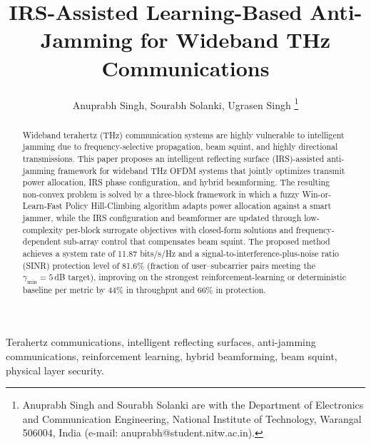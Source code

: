 \documentclass[10pt,conference]{IEEEtran}
\begin{document}

\title{IRS-Assisted Learning-Based Anti-Jamming for Wideband THz Communications}

\author{Anuprabh Singh, Sourabh Solanki, Ugrasen Singh
\thanks{Anuprabh Singh and Sourabh Solanki are with the Department of Electronics and Communication Engineering, National Institute of Technology, Warangal 506004, India (e-mail: anuprabh@student.nitw.ac.in).}}

\maketitle


\begin{abstract}
Wideband terahertz (THz) communication systems are highly vulnerable to intelligent jamming due to frequency-selective propagation, beam squint, and highly directional transmissions. This paper proposes an intelligent reflecting surface (IRS)-assisted anti-jamming framework for wideband THz OFDM systems that jointly optimizes transmit power allocation, IRS phase configuration, and hybrid beamforming. The resulting non-convex problem is solved by a three-block framework in which a fuzzy Win-or-Learn-Fast Policy Hill-Climbing algorithm adapts power allocation against a smart jammer, while the IRS configuration and beamformer are updated through low-complexity per-block surrogate objectives with closed-form solutions and frequency-dependent sub-array control that compensates beam squint. The proposed method achieves a system rate of 11.87 bits/s/Hz and a signal-to-interference-plus-noise ratio (SINR) protection level of 81.6\% (fraction of user--subcarrier pairs meeting the $\gamma_{\min}=5$\,dB target), improving on the strongest reinforcement-learning or deterministic baseline per metric by 44\% in throughput and 66\% in protection.

\end{abstract}

\begin{IEEEkeywords}
Terahertz communications, intelligent reflecting surfaces, anti-jamming communications, reinforcement learning, hybrid beamforming, beam squint, physical layer security.
\end{IEEEkeywords}
\end{document}
